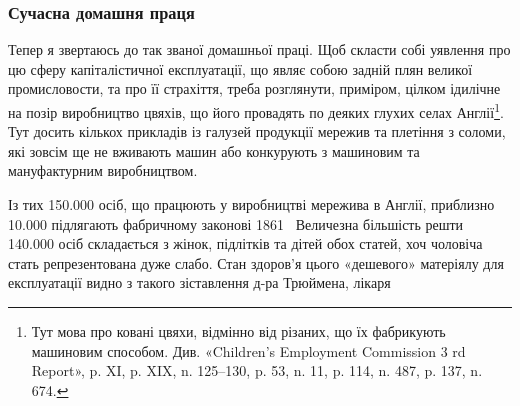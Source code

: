 \subsubsection{Сучасна домашня праця}

Тепер я звертаюсь до так званої домашньої праці. Щоб скласти
собі уявлення про цю сферу капіталістичної експлуатації, що
являє собою задній плян великої промисловости, та про її страхіття,
треба розглянути, приміром, цілком ідилічне на позір виробництво
цвяхів, що його провадять по деяких глухих селах Англії\footnote{
Тут мова про ковані цвяхи, відмінно від різаних, що їх фабрикують
машиновим способом. Див. «Children’s Employment Commission
3 rd Report», p. XI, p. XIX, n. 125--130, p. 53, n. 11, p. 114, n. 487,
p. 137, n. 674.
}.
Тут досить кількох прикладів із галузей продукції мережив та
плетіння з соломи, які зовсім ще не вживають машин або конкурують
з машиновим та мануфактурним виробництвом.

Із тих \num{150.000} осіб, що працюють у виробництві мережива в
Англії, приблизно \num{10.000} підлягають фабричному законові 1861~
Величезна більшість решти \num{140.000} осіб складається з жінок,
підлітків та дітей обох статей, хоч чоловіча стать репрезентована
дуже слабо. Стан здоров’я цього «дешевого» матеріялу для експлуатації
видно з такого зіставлення д-ра Трюймена, лікаря
\parbreak{}  %

